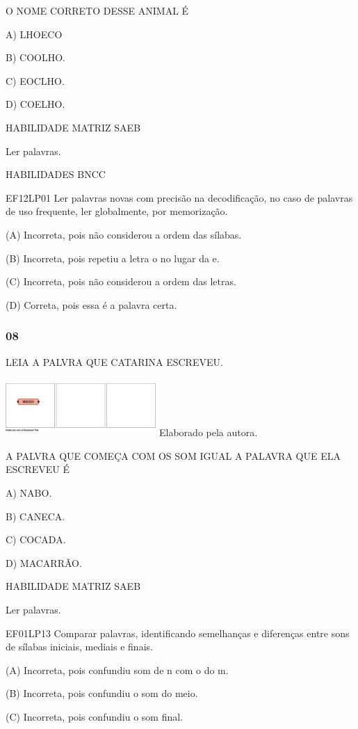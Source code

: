 \begin{escola}
O NOME CORRETO DESSE ANIMAL É

A) LHOECO

B) COOLHO.

C) EOCLHO.

D) COELHO.

HABILIDADE MATRIZ SAEB

Ler palavras.

HABILIDADES BNCC

EF12LP01 Ler palavras novas com precisão na decodificação, no caso de
palavras de uso frequente, ler globalmente, por memorização.

(A) Incorreta, pois não considerou a ordem das sílabas.

(B) Incorreta, pois repetiu a letra o no lugar da e.

(C) Incorreta, pois não considerou a ordem das letras.

(D) Correta, pois essa é a palavra
certa.\protect\hypertarget{_heading=h.9bc4fu3nu5it}{}{}

\subsubsection{08}\label{section-80}

LEIA A PALVRA QUE CATARINA ESCREVEU.

\includegraphics[width=2.25361in,height=0.86599in]{media/image247.png}
Elaborado pela autora.

A PALVRA QUE COMEÇA COM OS SOM IGUAL A PALAVRA QUE ELA ESCREVEU É

A) NABO.

B) CANECA.

C) COCADA.

D) MACARRÃO.

HABILIDADE MATRIZ SAEB

Ler palavras.

EF01LP13 Comparar palavras, identificando semelhanças e diferenças entre
sons de sílabas iniciais, mediais e finais.

(A) Incorreta, pois confundiu som de n com o do m.

(B) Incorreta, pois confundiu o som do meio.

(C) Incorreta, pois confundiu o som final.


\end{escola}

